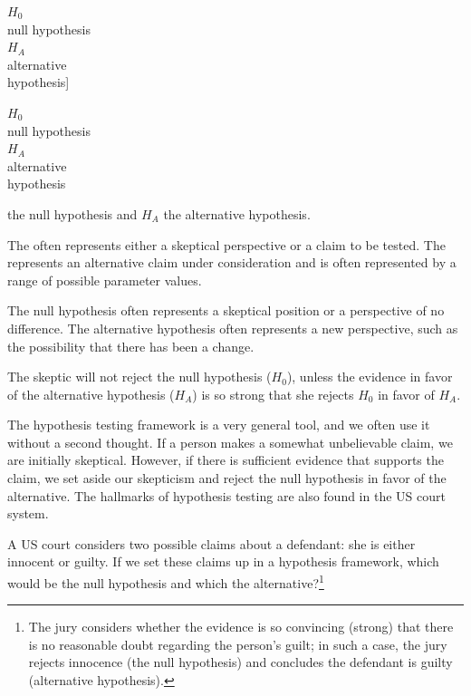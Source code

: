 $H_0$\\\footnotesize null hypothesis\vspace{3mm}\\\normalsize $H_A$\\\footnotesize alternative\\ hypothesis]{\raggedright\vspace{6mm}

$H_0$\\\footnotesize null hypothesis\vspace{3mm}\\\normalsize $H_A$\\\footnotesize alternative\\ hypothesis} the null hypothesis and $H_A$ the alternative hypothesis.

\begin{termBox}{
{\small The  often represents either a skeptical perspective or a claim to be tested. The  represents an alternative claim under consideration and is often represented by a range of possible parameter values.}}
\end{termBox}

The null hypothesis often represents a skeptical position or a perspective of no difference. The alternative hypothesis often represents a new perspective, such as the possibility that there has been a change. 

\begin{tipBox}{
The skeptic will not reject the null hypothesis ($H_0$), unless the evidence in favor of the alternative hypothesis ($H_A$) is so strong that she rejects $H_0$ in favor of $H_A$.}
\end{tipBox}

The hypothesis testing framework is a very general tool, and we often use it without a second thought. If a person makes a somewhat unbelievable claim, we are initially skeptical. However, if there is sufficient evidence that supports the claim, we set aside our skepticism and reject the null hypothesis in favor of the alternative. The hallmarks of hypothesis testing are also found in the US court system. 

\begin{exercise} \label{hypTestCourtExample}
A US court considers two possible claims about a defendant: she is either innocent or guilty. If we set these claims up in a hypothesis framework, which would be the null hypothesis and which the alternative?\footnote{The jury considers whether the evidence is so convincing (strong) that there is no reasonable doubt regarding the person's guilt; in such a case, the jury rejects innocence (the null hypothesis) and concludes the defendant is guilty (alternative hypothesis).}
\end{exercise}

